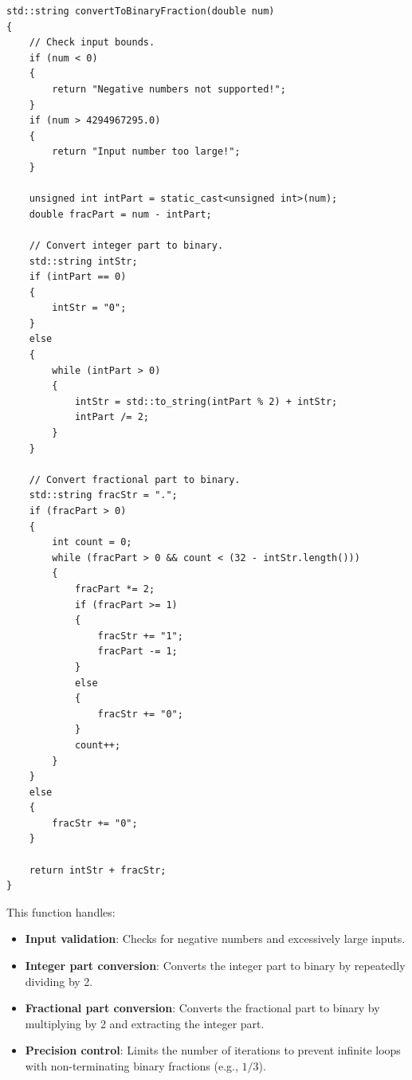 \documentclass{report}
\begin{document}

\begin{verbatim}
std::string convertToBinaryFraction(double num)
{
    // Check input bounds.
    if (num < 0)
    {
        return "Negative numbers not supported!";
    }
    if (num > 4294967295.0)
    {
        return "Input number too large!";
    }
    
    unsigned int intPart = static_cast<unsigned int>(num);
    double fracPart = num - intPart;
    
    // Convert integer part to binary.
    std::string intStr;
    if (intPart == 0)
    {
        intStr = "0";
    }
    else
    {
        while (intPart > 0)
        {
            intStr = std::to_string(intPart % 2) + intStr;
            intPart /= 2;
        }
    }
    
    // Convert fractional part to binary.
    std::string fracStr = ".";
    if (fracPart > 0)
    {
        int count = 0;
        while (fracPart > 0 && count < (32 - intStr.length()))
        {
            fracPart *= 2;
            if (fracPart >= 1)
            {
                fracStr += "1";
                fracPart -= 1;
            }
            else
            {
                fracStr += "0";
            }
            count++;
        }
    }
    else
    {
        fracStr += "0";
    }
    
    return intStr + fracStr;
}
\end{verbatim}

This function handles:
\begin{itemize}
	\item \textbf{Input validation}: Checks for negative numbers and excessively large inputs.
	\item \textbf{Integer part conversion}: Converts the integer part to binary by repeatedly dividing by 2.
	\item \textbf{Fractional part conversion}: Converts the fractional part to binary by multiplying by 2 and extracting the integer part.
	\item \textbf{Precision control}: Limits the number of iterations to prevent infinite loops with non-terminating binary fractions (e.g., \(1/3\)).
\end{itemize}


\end{document}
